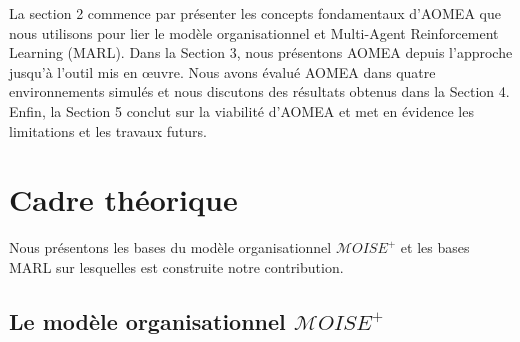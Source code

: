 

La section 2 commence par présenter les concepts fondamentaux d'AOMEA que nous utilisons pour lier le modèle organisationnel et Multi-Agent Reinforcement Learning (MARL).
Dans la Section 3, nous présentons AOMEA depuis l'approche jusqu'à l'outil mis en œuvre. Nous avons évalué AOMEA dans quatre environnements simulés et nous discutons des résultats obtenus dans la Section 4. Enfin, la Section 5 conclut sur la viabilité d'AOMEA et met en évidence les limitations et les travaux futurs.


\section{Cadre théorique}





Nous présentons les bases du modèle organisationnel $\mathcal{M}OISE^+$ et les bases MARL sur lesquelles est construite notre contribution.

\subsection{Le modèle organisationnel $\mathcal{M}OISE^+$}

